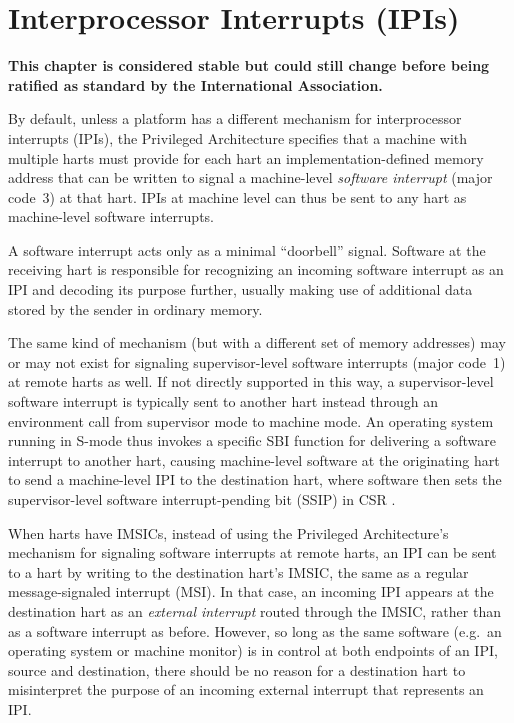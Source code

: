 
\chapter{Interprocessor Interrupts (IPIs)}
\label{ch:IPIs}

\textbf{%
This chapter is considered stable but could still change before being
ratified as standard by the {\RISCV} International Association.%
}
\bigskip

By default, unless a platform has a different mechanism for
interprocessor interrupts (IPIs), the {\RISCV} Privileged Architecture
specifies that a machine with multiple harts must provide for each hart
an implementation-defined memory address that can be written to signal
a machine-level \emph{software interrupt} (major code~3) at that hart.
IPIs at machine level can thus be sent to any hart as machine-level
software interrupts.

\begin{commentary}
A {\RISCV} software interrupt acts only as a minimal ``doorbell''
signal.
Software at the receiving hart is responsible for recognizing an
incoming software interrupt as an IPI and decoding its purpose further,
usually making use of additional data stored by the sender in ordinary
memory.
\end{commentary}

The same kind of mechanism (but with a different set of memory addresses) may
or may not exist for signaling supervisor-level software interrupts
(major code~1) at remote harts as well.
If not directly supported in this way, a supervisor-level software
interrupt is typically sent to another hart instead through an environment call
from supervisor mode to machine mode.
An operating system running in \mbox{S-mode} thus invokes a specific
SBI function for delivering a software interrupt to another hart,
causing machine-level software at the originating hart to send a
machine-level IPI to the destination hart, where software then sets the
supervisor-level software interrupt-pending bit (SSIP) in CSR .

When harts have IMSICs, instead of using the Privileged Architecture's
mechanism for signaling software interrupts at remote harts, an IPI
can be sent to a hart by writing to the destination hart's IMSIC, the
same as a regular message-signaled interrupt (MSI)\@.
In that case, an incoming IPI appears at the destination hart as an
\emph{external interrupt} routed through the IMSIC, rather than as a
software interrupt as before.
However, so long as the same software (e.g.\ an operating system or
machine monitor) is in control at both endpoints of an IPI, source
and destination, there should be no reason for a destination hart
to misinterpret the purpose of an incoming external interrupt that
represents an IPI.


